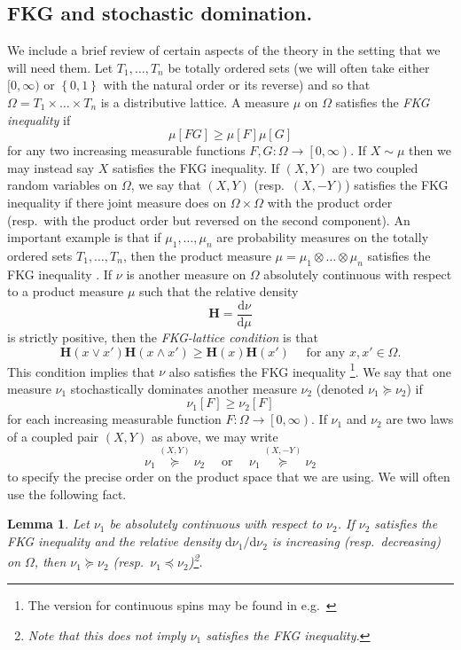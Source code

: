 \documentclass{article}
\newtheorem{lemma}[theorem]{Lemma}
\numberwithin{equation}{section}
\theoremstyle{definition}
\theoremstyle{definition}
\theoremstyle{remark}
\renewcommand{\d}{\mathrm{d}}
\renewcommand{\d}{\mathrm{d}}
\renewcommand{\H}{\mathbf{H}}
\begin{document}
\subsection{FKG and stochastic domination. }We include a brief review of certain aspects of the theory in the setting that we will need them. Let $T_1,\ldots,T_n$ be totally ordered sets (we will often take either $[0,\infty)$ or $\left\{ 0,1 \right\}$ with the natural order or its reverse) and so that $\Omega = T_1 \times \ldots \times T_n$ is a distributive lattice. A measure $\mu$ on $\Omega$ satisfies the \emph{FKG inequality} if  
\[
	\mu\left[ FG \right] \geq \mu\left[ F \right] \mu\left[ G \right] 
\] 
for any two increasing measurable functions $F,G : \Omega \to \left[ 0,\infty\right)$. If $X \sim \mu$ then we may instead say $X$ satisfies the FKG inequality. If $(X,Y)$ are two coupled random variables on $\Omega$, we say that $(X,Y)$ (resp.~$(X,-Y)$) satisfies the FKG inequality if there joint measure does on $\Omega \times \Omega$ with the product order (resp.~with the product order but reversed on the second component).
An important example is that if $\mu_1,\ldots,\mu_n$ are probability measures on the totally ordered sets $T_1, \ldots, T_n$, then the product measure $\mu = \mu_1 \otimes \ldots \otimes \mu_n$ satisfies the FKG inequality \cite{harris1960lower}. If $\nu$ is another measure on $\Omega$ absolutely continuous with respect to a product measure $\mu$ such that the relative density
	\[
	\H = \frac{\d \nu}{\d \mu}
	\] 
	is strictly positive, then the \emph{FKG-lattice condition} is that
	\[
		\H(x \vee x')  \H(x \wedge x') \geq \H(x)  \H(x') \quad \text{ for any } x,x' \in \Omega.
	\] 
This condition implies that $\nu$ also satisfies the FKG inequality \cite{FKG}{\hypersetup{linkcolor=black}\footnote{The version for continuous spins may be found in e.g.~\cite{GRS,preston1974generalization}}}. We say that one measure $\nu_1$ stochastically dominates another measure $\nu_2$ (denoted $\nu_1 \succeq \nu_2$) if 
\[
\nu_1\left[ F \right] \geq \nu_2\left[ F \right] 
\] 
for each increasing measurable function $F : \Omega \to \left[ 0,\infty \right)$. If $\nu_1$ and $\nu_2$ are two laws of a coupled pair $(X,Y)$ as above, we may write
\[
	\nu_1 \overset{(X,Y)}{\succeq} \nu_2 \quad \text{ or }\quad \nu_1 \overset{(X,-Y)}{\succeq} \nu_2
\] 
to specify the precise order on the product space that we are using.
We will often use the following fact.
\begin{lemma}\label{lemma:stochdom}
	Let $\nu_1$ be absolutely continuous with respect to $\nu_2$. If $\nu_2$ satisfies the FKG inequality and the relative density $\d \nu_1 / \d \nu_2$ is increasing (resp.~decreasing) on $\Omega$, then $\nu_1 \succeq \nu_2$ (resp.~$\nu_1 \preceq \nu_2$)\footnote{Note that this does not imply $\nu_1$ satisfies the FKG inequality.}. 
\end{lemma}
\end{document}
